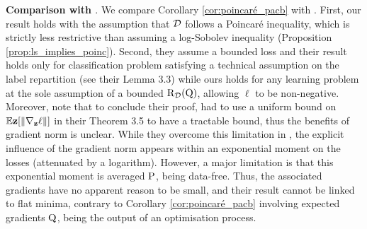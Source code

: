 \noindent\textbf{Comparison with \citet{gat2022grad}}. We compare Corollary \ref{cor:poincaré_pacb} with \citet[Theorems 3.5, 3.6]{gat2022grad}.
First, our result holds with the assumption that $\D$ follows a Poincaré inequality, which is strictly less restrictive than assuming a log-Sobolev inequality (Proposition \ref{prop:ls_implies_poinc}).
Second, they assume a bounded loss and their result holds only for classification problem satisfying a technical assumption on the label repartition (see their Lemma 3.3) while ours holds for any learning problem at the sole assumption of a bounded $\Risk_\D(\Q)$, allowing $\ell$ to be non-negative. 
Moreover, note that to conclude their proof, \citet{gat2022grad} had to use a uniform bound on $\Ebb{\z}[\|\nabla_\z \ell\|]$ in their Theorem 3.5 to have a tractable bound, thus the benefits of gradient norm is unclear.
While they overcome this limitation in \citet[Theorem 3.6]{gat2022grad}, the explicit influence of the gradient norm appears within an exponential moment on the losses (attenuated by a logarithm).
However, a major limitation is that this exponential moment is averaged \wrt $\P$, being data-free.
Thus, the associated gradients have no apparent reason to be small, and their result cannot be linked to flat minima, contrary to Corollary \ref{cor:poincaré_pacb} involving expected gradients \wrt $\Q$, being the output of an optimisation process. 

